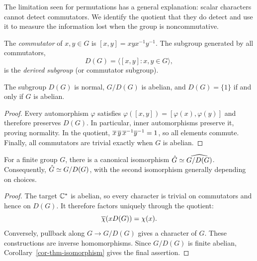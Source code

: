 The limitation seen for permutations has a general explanation: scalar
characters cannot detect commutators. We identify the quotient that they do
detect and use it to measure the information lost when the group is
noncommutative.

\begin{defn}
\label{notation-18}\label{notation-19}
The \emph{commutator} of $x,y\in G$ is $[x,y]=xyx^{-1}y^{-1}$.
The subgroup generated by all commutators,
\[
 D(G)=\langle[x,y]:x,y\in G\rangle,
\]
is the \emph{derived subgroup} (or commutator subgroup).
\end{defn}


\begin{prop}
\label{prop-pte-grpe-derive}
The subgroup $D(G)$ is normal, $G/D(G)$ is abelian, and $D(G)=\{1\}$ if and
only if $G$ is abelian.
\end{prop}
\begin{proof}
Every automorphism $\varphi$ satisfies
$\varphi([x,y])=[\varphi(x),\varphi(y)]$ and therefore preserves $D(G)$.
In particular, inner automorphisms preserve it, proving normality.
In the quotient, $\overline{x}\,\overline{y}\,\overline{x}^{-1}\overline{y}^{-1}=1$, so all elements
commute. Finally, all commutators are trivial exactly when $G$ is abelian.
\end{proof}


\begin{prop}
\label{prop-descr-dual-grpe-derive}
For a finite group $G$, there is a canonical isomorphism
$\hat{G}\simeq\widehat{G/D(G)}$. Consequently,
$\hat{G}\simeq G/D(G)$, with the second isomorphism generally depending on choices.
\end{prop}
\begin{proof}
The target $\mathbb{C}^*$ is abelian, so every character is trivial on commutators
and hence on $D(G)$. It therefore factors uniquely through the quotient:
\[
 \overline{\chi}(xD(G))=\chi(x).
\]
Conversely, pullback along $G\to G/D(G)$ gives a character of $G$.
These constructions are inverse homomorphisms. Since $G/D(G)$ is finite
abelian, Corollary~\ref{cor-thm-isomorphism} gives the final assertion.
\end{proof}

